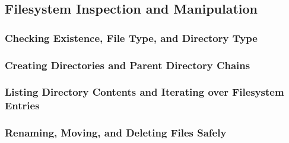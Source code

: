 \subsection{Filesystem Inspection and Manipulation}
\subsubsection{Checking Existence, File Type, and Directory Type}
\subsubsection{Creating Directories and Parent Directory Chains}
\subsubsection{Listing Directory Contents and Iterating over Filesystem Entries}
\subsubsection{Renaming, Moving, and Deleting Files Safely}
